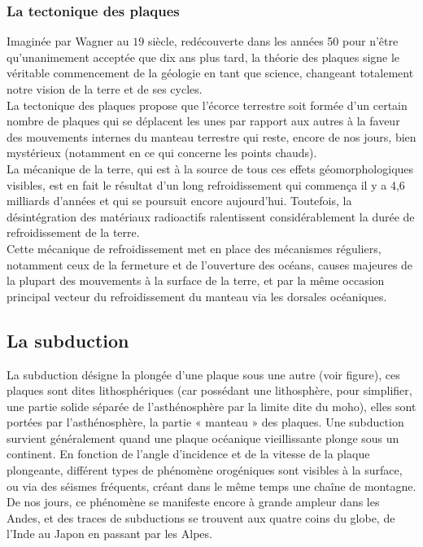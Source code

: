 \documentclass[a4paper,11pt]{article}
\begin{document}
\subsubsection{La tectonique des plaques}

Imaginée par Wagner au $19$ siècle, redécouverte dans les années 50 pour n'être qu'unanimement acceptée que dix ans plus tard, la théorie des plaques signe le véritable commencement de la géologie en tant que science, changeant totalement notre vision de la terre et de ses cycles. \\
La tectonique des plaques propose que l'écorce terrestre soit formée d'un certain nombre de plaques qui se déplacent les unes par rapport aux autres à la faveur des mouvements internes du manteau terrestre qui reste, encore de nos jours, bien mystérieux (notamment en ce qui concerne les points chauds). \\
La mécanique de la terre, qui est à la source de tous ces effets géomorphologiques visibles, est en fait le résultat d'un long refroidissement qui commença il y a 4,6 milliards d'années et qui se poursuit encore aujourd'hui. Toutefois, la désintégration des matériaux radioactifs ralentissent considérablement la durée de refroidissement de la terre. \\
Cette mécanique de refroidissement met en place des mécanismes réguliers, notamment ceux de la fermeture et de l'ouverture des océans, causes majeures de la plupart des mouvements à la surface de la terre, et par la même occasion principal vecteur du refroidissement du manteau via les dorsales océaniques. \\

\subsection{La subduction}

La subduction désigne la plongée d'une plaque sous une autre (voir figure), ces plaques sont dites lithosphériques (car possédant une lithosphère, pour simplifier, une partie solide séparée de l'asthénosphère par la limite dite du moho), elles sont portées par l'asthénosphère, la partie « manteau » des plaques.
Une subduction survient généralement quand une plaque océanique vieillissante plonge sous un continent. En fonction de l'angle d'incidence et de la vitesse de la plaque plongeante, différent types de phénomène orogéniques sont visibles à la surface, ou via des séismes fréquents, créant dans le même temps une chaîne de montagne. De nos jours, ce phénomène se manifeste encore à grande ampleur dans les Andes, et des traces de subductions se trouvent aux quatre coins du globe, de l'Inde au Japon en passant par les Alpes. \\
\end{document}

